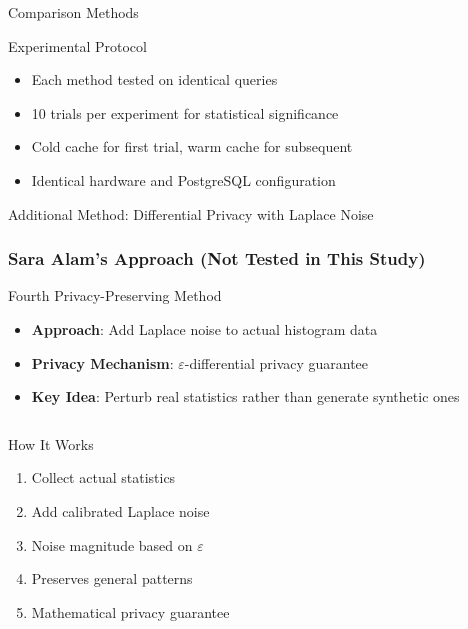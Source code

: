 \documentclass{beamer}
\begin{document}
\begin{frame}{Comparison Methods}
\begin{alertblock}{Experimental Protocol}
\begin{itemize}
    \item Each method tested on identical queries
    \item 10 trials per experiment for statistical significance
    \item Cold cache for first trial, warm cache for subsequent
    \item Identical hardware and PostgreSQL configuration
\end{itemize}
\end{alertblock}

\end{frame}

\begin{frame}{Additional Method: Differential Privacy with Laplace Noise}
\frametitle{Sara Alam's Approach (Not Tested in This Study)}

\begin{block}{Fourth Privacy-Preserving Method}
\begin{itemize}
    \item \textbf{Approach}: Add Laplace noise to actual histogram data
    \item \textbf{Privacy Mechanism}: $\varepsilon$-differential privacy guarantee
    \item \textbf{Key Idea}: Perturb real statistics rather than generate synthetic ones
\end{itemize}
\end{block}

\begin{columns}[T]
\begin{column}{0.5\textwidth}
\begin{exampleblock}{How It Works}
\begin{enumerate}
    \item Collect actual statistics
    \item Add calibrated Laplace noise
    \item Noise magnitude based on $\varepsilon$
    \item Preserves general patterns
    \item Mathematical privacy guarantee
\end{enumerate}
\end{exampleblock}
\end{column}


\end{columns}
\end{frame}
\end{document}
